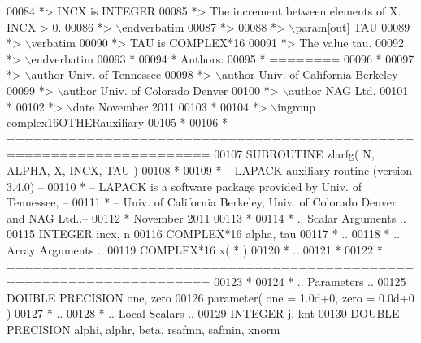 \begin{DoxyCode}
00084 \textcolor{comment}{*>          INCX is INTEGER}
00085 \textcolor{comment}{*>          The increment between elements of X. INCX > 0.}
00086 \textcolor{comment}{*> \(\backslash\)endverbatim}
00087 \textcolor{comment}{*>}
00088 \textcolor{comment}{*> \(\backslash\)param[out] TAU}
00089 \textcolor{comment}{*> \(\backslash\)verbatim}
00090 \textcolor{comment}{*>          TAU is COMPLEX*16}
00091 \textcolor{comment}{*>          The value tau.}
00092 \textcolor{comment}{*> \(\backslash\)endverbatim}
00093 \textcolor{comment}{*}
00094 \textcolor{comment}{*  Authors:}
00095 \textcolor{comment}{*  ========}
00096 \textcolor{comment}{*}
00097 \textcolor{comment}{*> \(\backslash\)author Univ. of Tennessee }
00098 \textcolor{comment}{*> \(\backslash\)author Univ. of California Berkeley }
00099 \textcolor{comment}{*> \(\backslash\)author Univ. of Colorado Denver }
00100 \textcolor{comment}{*> \(\backslash\)author NAG Ltd. }
00101 \textcolor{comment}{*}
00102 \textcolor{comment}{*> \(\backslash\)date November 2011}
00103 \textcolor{comment}{*}
00104 \textcolor{comment}{*> \(\backslash\)ingroup complex16OTHERauxiliary}
00105 \textcolor{comment}{*}
00106 \textcolor{comment}{*  =====================================================================}
00107 \textcolor{keyword}{      SUBROUTINE }zlarfg( N, ALPHA, X, INCX, TAU )
00108 \textcolor{comment}{*}
00109 \textcolor{comment}{*  -- LAPACK auxiliary routine (version 3.4.0) --}
00110 \textcolor{comment}{*  -- LAPACK is a software package provided by Univ. of Tennessee,    --}
00111 \textcolor{comment}{*  -- Univ. of California Berkeley, Univ. of Colorado Denver and NAG Ltd..--}
00112 \textcolor{comment}{*     November 2011}
00113 \textcolor{comment}{*}
00114 \textcolor{comment}{*     .. Scalar Arguments ..}
00115       \textcolor{keywordtype}{INTEGER}            incx, n
00116       \textcolor{keywordtype}{COMPLEX*16}         alpha, tau
00117 \textcolor{comment}{*     ..}
00118 \textcolor{comment}{*     .. Array Arguments ..}
00119       \textcolor{keywordtype}{COMPLEX*16}         x( * )
00120 \textcolor{comment}{*     ..}
00121 \textcolor{comment}{*}
00122 \textcolor{comment}{*  =====================================================================}
00123 \textcolor{comment}{*}
00124 \textcolor{comment}{*     .. Parameters ..}
00125       \textcolor{keywordtype}{DOUBLE PRECISION}   one, zero
00126       parameter( one = 1.0d+0, zero = 0.0d+0 )
00127 \textcolor{comment}{*     ..}
00128 \textcolor{comment}{*     .. Local Scalars ..}
00129       \textcolor{keywordtype}{INTEGER}            j, knt
00130       \textcolor{keywordtype}{DOUBLE PRECISION}   alphi, alphr, beta, rsafmn, safmin, xnorm

\end{DoxyCode}
